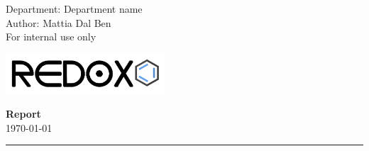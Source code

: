 



\pagestyle{plain}
\begin{flushleft}
Department: Department name \\
Author: Mattia Dal Ben \\
For internal use only
\end{flushleft}

\begin{flushright}\vspace{-20mm}
\includegraphics[height=1.5cm]{logo.png}
\end{flushright}

\begin{center}\vspace{0mm}
\textbf{ \LARGE \textbf{Report}}\\
\large \today
\end{center}

\rule{\linewidth}{0.1mm}




